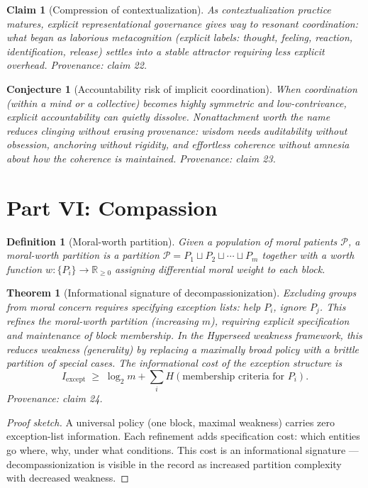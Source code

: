 \documentclass[11pt]{article}
\newtheorem{definition}{Definition}
\newtheorem{claim}{Claim}
\newtheorem{conjecture}{Conjecture}
\newtheorem{theorem}{Theorem}
\begin{document}
\begin{claim}[Compression of contextualization]
\label{claim:compress-ctx}
As contextualization practice matures, explicit representational governance gives way to resonant coordination: what began as laborious metacognition (explicit labels: thought, feeling, reaction, identification, release) settles into a stable attractor requiring less explicit overhead.
\emph{Provenance: claim 22.}
\end{claim}

\begin{conjecture}[Accountability risk of implicit coordination]
\label{conj:accountability}
When coordination (within a mind or a collective) becomes highly symmetric and low-contrivance, explicit accountability can quietly dissolve. Nonattachment worth the name reduces clinging without erasing provenance: wisdom needs auditability without obsession, anchoring without rigidity, and effortless coherence without amnesia about how the coherence is maintained.
\emph{Provenance: claim 23.}
\end{conjecture}

\section{Part VI: Compassion}

\begin{definition}[Moral-worth partition]
\label{def:moralpartition}
Given a population of moral patients $\mathcal{P}$, a \emph{moral-worth partition} is a partition $\mathcal{P} = P_1 \sqcup P_2 \sqcup \cdots \sqcup P_m$ together with a worth function $w\colon \{P_i\} \to \mathbb{R}_{\geq 0}$ assigning differential moral weight to each block.
\end{definition}

\begin{theorem}[Informational signature of decompassionization]
\label{thm:decomp}
Excluding groups from moral concern requires specifying exception lists: help $P_i$, ignore $P_j$. This refines the moral-worth partition (increasing $m$), requiring explicit specification and maintenance of block membership. In the Hyperseed weakness framework, this \emph{reduces weakness} (generality) by replacing a maximally broad policy with a brittle partition of special cases. The informational cost of the exception structure is
\[
  I_{\mathrm{except}} \;\geq\; \log_2 m + \sum_i H(\text{membership criteria for } P_i).
\]
\emph{Provenance: claim 24.}
\end{theorem}
\begin{proof}[Proof sketch]
A universal policy (one block, maximal weakness) carries zero exception-list information. Each refinement adds specification cost: which entities go where, why, under what conditions. This cost is an informational signature — decompassionization is visible in the record as increased partition complexity with decreased weakness.
\end{proof}
\end{document}
